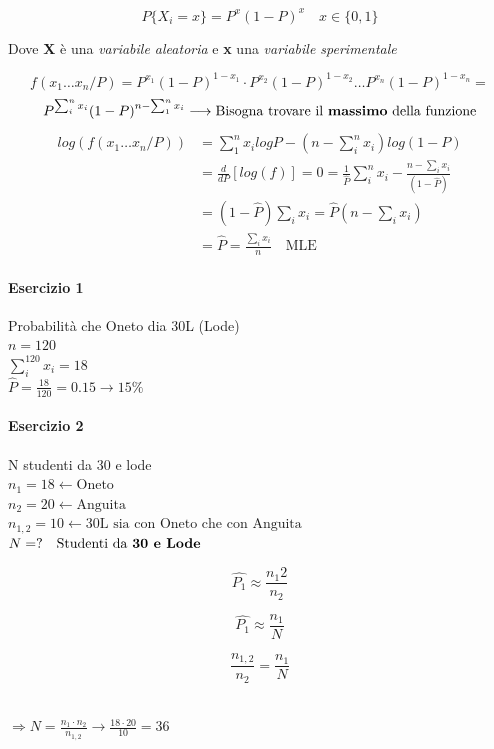 \documentclass[]{article}
\begin{document}
    \[ P\{X_i = x\} = P^x (1-P)^x \quad x \in \{0, 1\} \]
    \centerline{Dove \textbf{X} è una \textit{variabile aleatoria} e \textbf{x} una \textit{variabile sperimentale} }
    \[ f(x_1 \ldots x_n / P) = P^{x_1} (1-P)^{1-x_1} \cdot P^{x_2} (1-P)^{1-x_2} \ldots P^{x_n} (1-P)^{1-x_n} = \]
    \[ P^{\sum_{i}^{n}x_i} (1-P)^{n - \sum_{1}^{n} x_i} \longrightarrow \text{Bisogna trovare il \textbf{massimo} della funzione} \]
    \begin{equation*}
        \begin{split}
            log(f(x_1 \ldots x_n / P)) &= \sum_{1}^{n} x_i log P - (n - \sum_{i}^{n} x_i) log(1-P) \\
            &= \frac{d}{dP}[log(f)] = 0 = \frac{1}{\hat{P}} \sum_{i}^{n} x_i - \frac{n - \sum_{i}^{} x_i }{(1-\hat{P})} \\
            &= (1- \hat{P}) \sum_{i}^{} x_i = \hat{P} (n - \sum_{i}^{} x_i) \\
            &= \hat{P} = \frac{\sum_{i}^{} x_i }{n} \quad \text{MLE}
        \end{split}
    \end{equation*}
    \paragraph{Esercizio 1} Probabilità che Oneto dia 30L (Lode) \\
    $n = 120$ \\
    $\sum_{i}^{120} x_i = 18$ \\
    $\hat{P} = \frac{18}{120} = 0.15 \rightarrow 15\%$ \\
    \paragraph{Esercizio 2} N studenti da 30 e lode \\
    $n_1 = 18 \leftarrow \text{Oneto}$ \\ 
    $n_2 = 20 \leftarrow \text{Anguita}$ \\
    $n_{1,2} = 10 \leftarrow \text{30L sia con Oneto che con Anguita}$ \\
    $N= ? \quad \text{Studenti da \textbf{30 e Lode}}$ \\
    \begin{minipage}{0.30\textwidth}
        \[ \hat{P_1} \approx \frac{n_1 2}{n_2} \]
    \end{minipage}
    \begin{minipage}{0.30\textwidth}
        \[ \hat{P_1} \approx \frac{n_1}{N} \]
    \end{minipage}
    \begin{minipage}{0.30\textwidth}
        \[ \frac{n_{1,2}}{n_2} = \frac{n_1}{N} \]
    \end{minipage} \\
    $ \Longrightarrow N= \frac{n_1 \cdot n_2}{n_{1,2}} \rightarrow \frac{18 \cdot 20}{10} = 36 $
\end{document}
